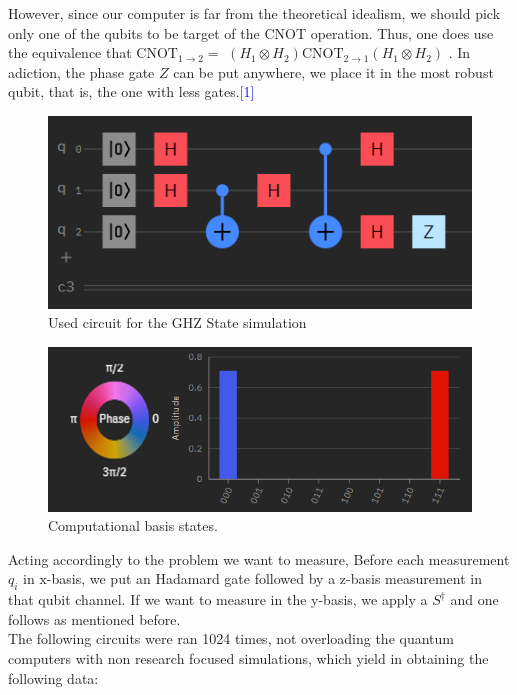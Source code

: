 \documentclass{article}
\begin{document}
However, since our computer is far from the theoretical idealism, we should pick only one of the qubits to be target of the CNOT operation. Thus, one does use the equivalence that $\mathrm{CNOT}_{1 \rightarrow 2}=$ $\left(H_{1} \otimes H_{2}\right) \mathrm{CNOT}_{2 \rightarrow 1}\left(H_{1} \otimes H_{2}\right)$ . In adiction, the phase gate $\boxed{Z}$ can be put
anywhere, we  place it in the most robust qubit, that is,
the one with less gates.\textcolor{blue}{[1]}
\begin{figure} [H]
    \centering
    \includegraphics[scale = 0.8]{2.png}
    \caption{Used circuit for the GHZ State simulation}
    \label{fig:my_label}
\end{figure}
\begin{figure} [H]
    \centering
    \includegraphics[scale = 0.6]{3.png}
    \caption{Computational basis states.}
\end{figure}
Acting accordingly to the problem we want to measure, Before each measurement $q_{i}$ in $\mathrm{x}$-basis, we put an Hadamard gate followed by a z-basis measurement in that qubit channel. If we want to measure in the y-basis, we apply a $S^{\dagger}$ and one follows as mentioned before.\\

The following circuits were ran 1024 times, not overloading the quantum computers with non research focused simulations, which yield in obtaining the following data:
\end{document}
